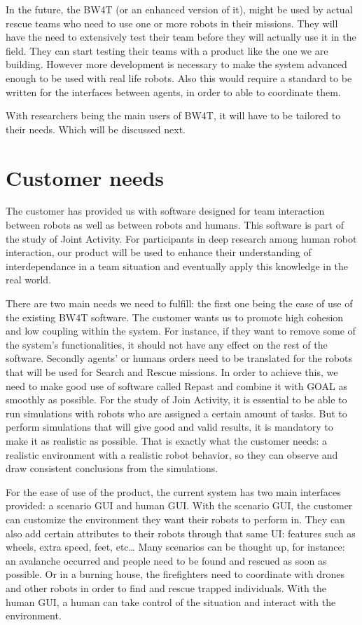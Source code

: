\documentclass[a4paper]{article}
\begin{document}
In the future, the BW4T (or an enhanced version of it), might be used by actual rescue teams who need to use one or more robots in their missions. They will have the need to extensively test their team before they will actually use it in the field. They can start testing their teams with a product like the one we are building. However more development is necessary to make the system advanced enough to be used with real life robots. Also this would require a standard to be written for the interfaces between agents, in order to able to coordinate them. 

With researchers being the main users of BW4T, it will have to be tailored to their needs. Which will be discussed next.

\section{Customer needs}
The customer has provided us with software designed for team interaction between robots as well as between robots and humans. This software is part of the study of Joint Activity. For participants in deep research among human robot interaction, our product will be used to enhance their understanding of interdependance in a team situation and eventually apply this knowledge in the real world.

There are two main needs we need to fulfill: the first one being the ease of use of the existing BW4T software. The customer wants us to promote high cohesion and low coupling within the system. For instance, if they want to remove some of the system's functionalities, it should not have any effect on the rest of the software. Secondly agents’ or humans orders need to be translated for the robots that will be used for Search and Rescue missions. In order to achieve this, we need to make good use of software called Repast and combine it with GOAL as smoothly as possible. For the study of Join Activity, it is essential to be able to run simulations with robots who are assigned a certain amount of tasks. But to perform simulations that will give good and valid results, it is mandatory to make it as realistic as possible. That is exactly what the customer needs: a realistic environment with a realistic robot behavior, so they can observe and draw consistent conclusions from the simulations.

For the ease of use of the product, the current system has two main interfaces provided: a scenario GUI and human GUI. With the scenario GUI, the customer can customize the environment they want their robots to perform in. They can also add certain attributes to their robots through that same UI: features such as wheels, extra speed, feet, etc… Many scenarios can be thought up, for instance: an avalanche occurred and people need to be found and rescued as soon as possible. Or in a burning house, the firefighters need to coordinate with drones and other robots in order to find and rescue trapped individuals. With the human GUI, a human can take control of the situation and interact with the environment. 
\end{document}
